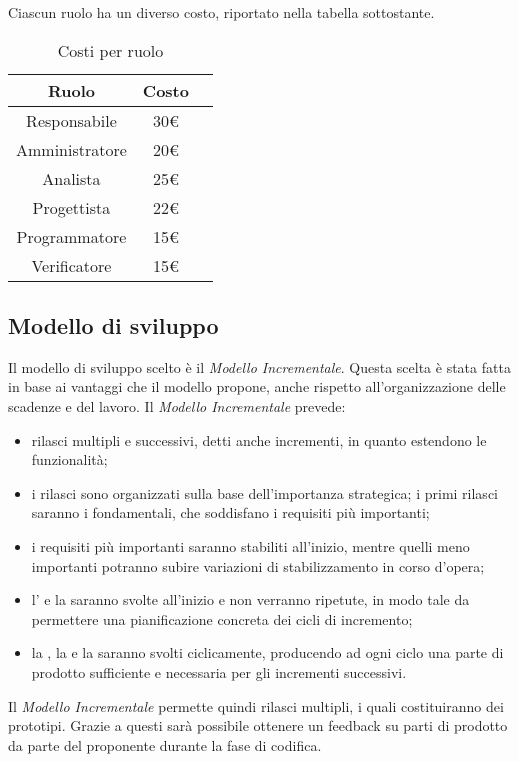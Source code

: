 Ciascun ruolo ha un diverso costo, riportato nella tabella sottostante.
\begin{table}[H]
	\centering
	\begin{tabular}{|c|c|c|}
		\hline
		\textbf{Ruolo} &
		\textbf{Costo}\\
		\hline
		Responsabile & 30€  \\
		\hline
		Amministratore &  20€ \\
		\hline
		Analista & 25€  \\
		\hline
		Progettista & 22€  \\
		\hline 
		Programmatore & 15€  \\
		\hline
		Verificatore &  15€ \\
		\hline
	\end{tabular}
	\caption{Costi per ruolo}
\end{table}

\subsection{Modello di sviluppo}
Il modello di sviluppo scelto è il \textit{Modello Incrementale}. Questa scelta è stata fatta in base ai vantaggi che il modello propone, anche rispetto all'organizzazione delle scadenze e del lavoro.
Il \textit{Modello Incrementale} prevede:
\begin{itemize}
	\item rilasci multipli e successivi, detti anche incrementi, in quanto estendono le funzionalità;
	\item i rilasci sono organizzati sulla base dell'importanza strategica; i primi rilasci saranno i fondamentali, che soddisfano i requisiti più importanti;
	\item i requisiti più importanti saranno stabiliti all'inizio, mentre quelli meno importanti potranno subire variazioni di stabilizzamento in corso d'opera;
	\item l’\AR{} e la \PA{} saranno svolte all'inizio e non verranno ripetute, in modo tale da permettere una pianificazione concreta dei cicli di incremento;
	\item la \PD{}, la \Cod{} e la \VV{} saranno svolti ciclicamente, producendo ad ogni ciclo una parte di prodotto sufficiente e necessaria per gli incrementi successivi.
\end{itemize}
Il \textit{Modello Incrementale} permette quindi rilasci multipli, i quali costituiranno dei prototipi. Grazie a questi sarà possibile ottenere un feedback su parti di prodotto da parte del proponente durante la fase di codifica.


